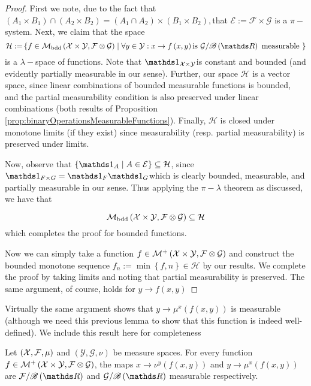 \begin{proof}
First we note, due to the fact that $\left(A_{1}\times B_{1}\right)\cap\left(A_{2}\times B_{2}\right)=\left(A_{1}\cap A_{2}\right)\times\left(B_{1}\times B_{2}\right),$that
$\mathcal{\mathcal{E:=}F}\times\mathcal{G}$ is a $\pi-$system. Next,
we claim that the space
\[
\mathcal{H:=}\left\{ f\in\mathcal{M_{\text{bdd}}}\left(\X\times\mathcal{Y},\mathcal{F}\otimes\mathcal{G}\right)\mid\forall y\in\mathcal{Y}:x\to f\left(x,y\right)\text{is }\mathcal{G}/\borel\left(\R\right)\text{ measurable }\right\} 
\]
is a $\lambda-$space of functions. Note that $\indicate_{\X\times\mathcal{Y}}$is
constant and bounded (and evidently partially measurable in our sense).
Further, our space $\mathcal{H}$ is a vector space, since linear
combinations of bounded measurable functions is bounded, and the partial
measurability condition is also preserved under linear combinations
(both results of Proposition \ref{prop:binaryOperationsMeasurableFunctions}).
Finally, $\mathcal{H}$ is closed under monotone limits (if they exist)
since measurability (resp. partial measurability) is preserved under
limits.

Now, observe that $\left\{ \indicate_{A}\mid A\in\mathcal{E}\right\} \subseteq\mathcal{H}$,
since $\indicate_{F\times G}=\indicate_{F}\indicate_{G}$which is
clearly bounded, measurable, and partially measurable in our sense.
Thus applying the $\pi-\lambda$ theorem as discussed, we have that

\[
\mathcal{M_{\text{bdd}}}\left(\mathcal{X}\times\mathcal{Y},\mathcal{F}\otimes\mathcal{G}\right)\subseteq\mathcal{H}
\]
which completes the proof for bounded functions.

Now we can simply take a function $f\in\mathcal{M}^{+}\left(\mathcal{X}\times\mathcal{Y},\mathcal{F}\otimes\mathcal{G}\right)$
and construct the bounded monotone sequence $f_{n}:=\min\left\{ f,n\right\} \in\mathcal{H}$
by our results. We complete the proof by taking limits and noting
that partial measurability is preserved. The same argument, of course,
holds for $y\to f\left(x,y\right)$
\end{proof}
Virtually the same argument shows that $y\to\mu^{x}\left(f\left(x,y\right)\right)$
is measurable (although we need this previous lemma to show that this
function is indeed well-defined). We include this result here for
completeness
\begin{lem}
\label{lem:partialIntegralMeasurability}Let $\left(\mathcal{X},\mathcal{F},\mu\right)$
and $\left(\mathcal{Y},\mathcal{G},\nu\right)$ be measure spaces.
For every function $f\in\mathcal{M}^{+}\left(\mathcal{X}\times\mathcal{Y},\mathcal{F}\otimes\mathcal{G}\right)$,
the maps $x\to\nu^{y}\left(f\left(x,y\right)\right)$ and $y\to\mu^{x}\left(f\left(x,y\right)\right)$
are $\mathcal{F}/\borel\left(\R\right)$ and $\mathcal{G}/\borel\left(\R\right)$
measurable respectively.
\end{lem}

